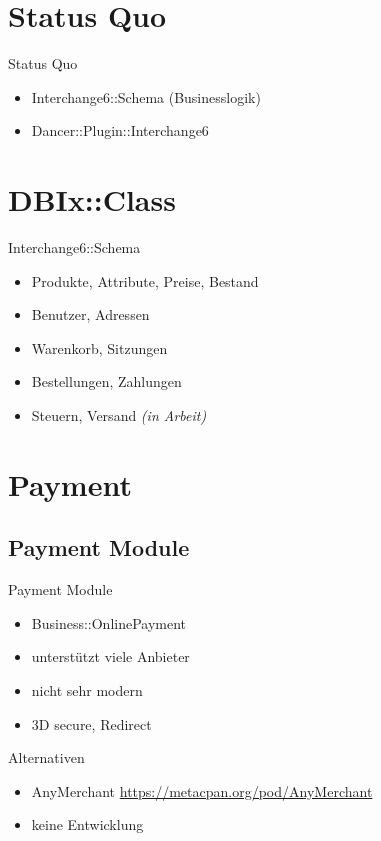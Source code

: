 \section{Status Quo}
\begin{frame}{Status Quo}
\begin{itemize}
 \item Interchange6::Schema (Businesslogik)
  \item Dancer::Plugin::Interchange6
\end{itemize}
\end{frame}

\section{DBIx::Class}
\begin{frame}{Interchange6::Schema}
\begin{itemize}
 \item Produkte, Attribute, Preise, Bestand
 \item Benutzer, Adressen
 \item Warenkorb, Sitzungen
 \item Bestellungen, Zahlungen
 \item Steuern, Versand \textit{(in Arbeit)}
\end{itemize}
\end{frame}

\section{Payment}
\subsection{Payment Module}
\begin{frame}{Payment Module}
\begin{itemize}
\item Business::OnlinePayment
\item unterstützt viele Anbieter
\item nicht sehr modern
\item 3D secure, Redirect
\end{itemize}
\end{frame}

\begin{frame}{Alternativen}
\begin{itemize}
\item AnyMerchant \url{https://metacpan.org/pod/AnyMerchant}
\item keine Entwicklung
\end{itemize}
\end{frame}

